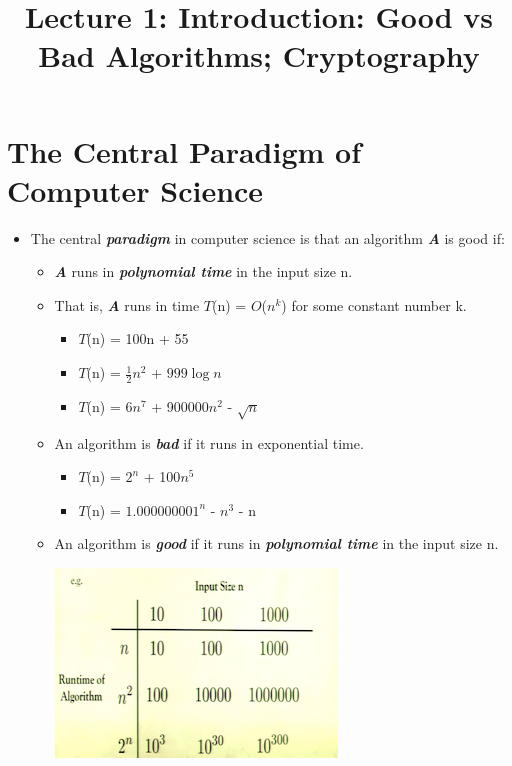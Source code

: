 \documentclass[12pt]{article}
\title{\huge Lecture 1: Introduction: Good vs Bad Algorithms; Cryptography}
\author{}
\date{}
\begin{document}
\maketitle


\section{The Central Paradigm of Computer Science}
\renewcommand{\labelitemii}{$\circ$}
\renewcommand{\labelitemiii}{$\cdot$}
\renewcommand{\labelitemiii}{$\rightarrow$}
\renewcommand{\labelitemiv}{$\star$}
\begin{itemize}
\item The central \textbf{\textit{paradigm}}  in computer science is that an algorithm \textbf{\textit{A}} is good if:
	\begin{itemize}
	\item \textbf{\textit{A}} runs in \textbf{\textit{polynomial time}} in the input size n.
	\item That is, \textbf{\textit{A}} runs in time $T$(n) = $O$($n^k$) for some constant number k.
		\begin{itemize}
		\item $T$(n) = 100n + 55
		\item $T$(n) = \( \frac{1}{2} \)$n^2$ + $999\log{}n$
		\item $T$(n) = 6$n^7$ + 900000$n^2$ - $\sqrt{n}$			
		\end{itemize}
	\item An algorithm is \textbf{\textit{bad}} if it runs in exponential time.
		\begin{itemize}
		\item $T$(n) = $2^n$ + 100$n^5$
		\item $T$(n) = $1.000000001^n$ - $n^3$ - n 
		\end{itemize}	
	\item An algorithm is \textbf{\textit{good}} if it runs in \textbf{\textit{polynomial time}} in the input size n.
	\begin{center}
	\includegraphics{lecture1a}
	\end{center}
	\end{itemize}
\end{itemize}
\end{document}
